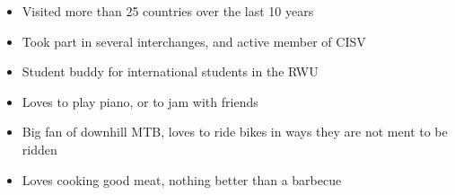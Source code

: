 \documentclass[10pt,a4paper,ragged2e,withhyper]{altacv}
\begin{document}
\begin{paracol}{2}
\divider\smallskip


\divider\smallskip


\smallskip


\divider

\divider

\divider


\medskip



\newpage


\begin{itemize}
\item Visited more than 25 countries over the last 10 years
\item Took part in several interchanges, and active member of CISV
\item Student buddy for international students in the RWU
\end{itemize}

\divider

\begin{itemize}
  \item Loves to play piano, or to jam with friends
  \item Big fan of downhill MTB, loves to ride bikes in ways they are not ment to be ridden
  \item Loves cooking good meat, nothing better than a barbecue
\end{itemize}











\end{paracol}
\end{document}
